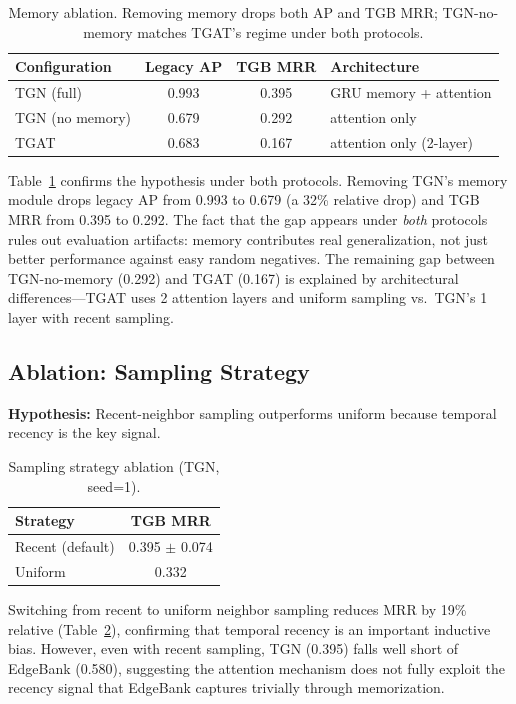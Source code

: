 \documentclass[10pt,twocolumn]{article}
\begin{document}
\begin{table}[t]
\centering
\caption{Memory ablation. Removing memory drops both AP and TGB MRR; TGN-no-memory matches TGAT's regime under both protocols.}
\label{tab:ablation_mem}
\small
\begin{tabular}{lccl}
\toprule
\textbf{Configuration} & \textbf{Legacy AP} & \textbf{TGB MRR} & \textbf{Architecture} \\
\midrule
TGN (full) & 0.993 & 0.395 & GRU memory + attention \\
TGN (no memory) & 0.679 & 0.292 & attention only \\
TGAT & 0.683 & 0.167 & attention only (2-layer) \\
\bottomrule
\end{tabular}
\end{table}

Table~\ref{tab:ablation_mem} confirms the hypothesis under both protocols.
Removing TGN's memory module drops legacy AP from 0.993 to 0.679 (a 32\% relative drop) and TGB MRR from 0.395 to 0.292.
The fact that the gap appears under \emph{both} protocols rules out evaluation artifacts: memory contributes real generalization, not just better performance against easy random negatives.
The remaining gap between TGN-no-memory (0.292) and TGAT (0.167) is explained by architectural differences---TGAT uses 2 attention layers and uniform sampling vs.\ TGN's 1 layer with recent sampling.

\subsection{Ablation: Sampling Strategy}

\textbf{Hypothesis:} Recent-neighbor sampling outperforms uniform because temporal recency is the key signal.

\begin{table}[t]
\centering
\caption{Sampling strategy ablation (TGN, seed=1).}
\label{tab:ablation_samp}
\small
\begin{tabular}{lc}
\toprule
\textbf{Strategy} & \textbf{TGB MRR} \\
\midrule
Recent (default) & 0.395 $\pm$ 0.074 \\
Uniform & 0.332 \\
\bottomrule
\end{tabular}
\end{table}

Switching from recent to uniform neighbor sampling reduces MRR by 19\% relative (Table~\ref{tab:ablation_samp}), confirming that temporal recency is an important inductive bias.
However, even with recent sampling, TGN (0.395) falls well short of EdgeBank (0.580), suggesting the attention mechanism does not fully exploit the recency signal that EdgeBank captures trivially through memorization.
\end{document}
